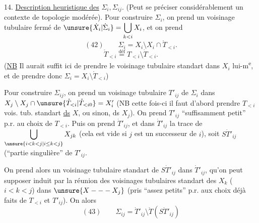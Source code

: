 14. \uline{Description heuristique des} $\Sigma_i,\Sigma_{ij}$.
(Peut se préciser considérablement  un contexte de topologie modérée).
Pour construire $\Sigma_i$, on prend un voisinage tubulaire
 fermé de
$\unsure{\dot X_i|\dot\Sigma_i}=\displaystyle\bigcup_{k<i}X_i$, et on prend
\[
(42)\qquad\Sigma_i=X_i\setminus X_i\cap\mathring T_{<i}.
\]
\[
\mathring T_{<i}\overset{\mathrm{déf}}{=}T_{<i}\setminus\dot T_{<i}.
\]
(\uline{NB} Il aurait suffit ici de prendre le voisinage tubulaire
standart dans $X_i$ lui-m\textsuperscript{e}, et de prendre donc
$\Sigma_i=X_i\setminus\mathring T_{<i}$)

Pour construire $\Sigma_{ij}$, on prend un voisinage tubulaire
$T'_{ij}$ de $\Sigma_i$ dans
$X_j\setminus X_j\cap\unsure{\mathring T_{<i}|\mathring T_{<i0}}=X'_i$
(NB cette fois-ci il faut  d'abord prendre
$T_{<i}$ vois. tub. standart \uline{ds} $X$, ou sinon, ds $X_j$).
On prend $T'_{ij}$ ``suffisamment petit'' p.r. au choix de $T_{<i}$.
Puis on prend $\dot T'_{ij}$, et dans $\dot T'_{ij}$
la trace de $\displaystyle\bigcup_{\unsure{i<k<j|i\leq k<j}}X_{jk}$
(cela est vide si $j$ est un successeur de $i$), soit $S\dot T'_{ij}$
(``partie singulière'' de $T'_{ij}$.


On prend alors un voisinage tubulaire standart
 de $S\dot T'_{ij}$ dans $\dot T'_{ij}$,
qu'on peut supposer induit par la réunion 
des voisinages tubulaires standart des $X_k$ ($i<k<j$)
dans $\unsure{X---X_j}$
(pris ``assez petits'' p.r. aux choix déjà faits de $T_{<i}$
et  $T'_{ij}$).
On  alors
\[
(43)\qquad\Sigma_{ij}=\dot T'_{ij}\setminus\mathring T(S\dot T'_{ij})
\]

